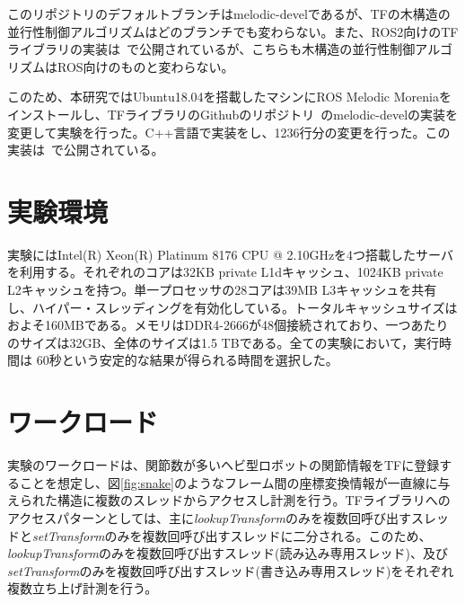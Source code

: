 \documentclass[a4paper]{jreport}	%
\begin{document}
このリポジトリのデフォルトブランチはmelodic-develであるが、TFの木構造の並行性制御アルゴリズムはどのブランチでも変わらない。また、ROS2向けのTFライブラリの実装は~\cite{ros2-geometry2}で公開されているが、こちらも木構造の並行性制御アルゴリズムはROS向けのものと変わらない。

このため、本研究ではUbuntu18.04を搭載したマシンにROS Melodic Moreniaをインストールし、TFライブラリのGithubのリポジトリ~\cite{ros-geometry2}のmelodic-develの実装を変更して実験を行った。C++言語で実装をし、1236行分の変更を行った。この実装は~\cite{ogiwara-geometry2}で公開されている。

\section{実験環境}

実験にはIntel(R) Xeon(R) Platinum 8176 CPU @ 2.10GHzを4つ搭載したサーバを利用する。それぞれのコアは32KB private L1dキャッシュ、1024KB private L2キャッシュを持つ。単一プロセッサの28コアは39MB L3キャッシュを共有し、ハイパー・スレッディングを有効化している。トータルキャッシュサイズはおよそ160MBである。メモリはDDR4-2666が48個接続されており、一つあたりのサイズは32GB、全体のサイズは1.5 TBである。全ての実験において，実行時間は 60秒という安定的な結果が得られる時間を選択した。

\section{ワークロード}

実験のワークロードは、関節数が多いヘビ型ロボットの関節情報をTFに登録することを想定し、図\ref{fig:snake}のようなフレーム間の座標変換情報が一直線に与えられた構造に複数のスレッドからアクセスし計測を行う。TFライブラリへのアクセスパターンとしては、主に\textit{lookupTransform}のみを複数回呼び出すスレッドと\textit{setTransform}のみを複数回呼び出すスレッドに二分される。このため、\textit{lookupTransform}のみを複数回呼び出すスレッド(読み込み専用スレッド)、及び\textit{setTransform}のみを複数回呼び出すスレッド(書き込み専用スレッド)をそれぞれ複数立ち上げ計測を行う。
\end{document}
